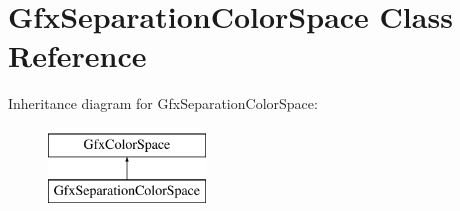 \hypertarget{class_gfx_separation_color_space}{}\section{Gfx\+Separation\+Color\+Space Class Reference}
\label{class_gfx_separation_color_space}
Inheritance diagram for Gfx\+Separation\+Color\+Space\+:\begin{figure}[H]
\begin{center}
\leavevmode
\includegraphics[height=2.000000cm]{class_gfx_separation_color_space}
\end{center}
\end{figure}
